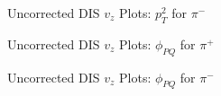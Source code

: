 \begin{frame}{Uncorrected DIS $v_z$ Plots: $p_T^2$ for $\pi^-$}
    \label{20.15f::pt2_pi-}

    \begin{figure}[t]
    \end{figure}

\end{frame}

\begin{frame}{Uncorrected DIS $v_z$ Plots: $\phi_{PQ}$ for $\pi^+$}
    \label{20.15g::phipq_pi+}

    \begin{figure}[t]
    \end{figure}

\end{frame}

\begin{frame}{Uncorrected DIS $v_z$ Plots: $\phi_{PQ}$ for $\pi^-$}
    \label{20.15h::phipq_pi-}

    \begin{figure}[t]
    \end{figure}

\end{frame}
